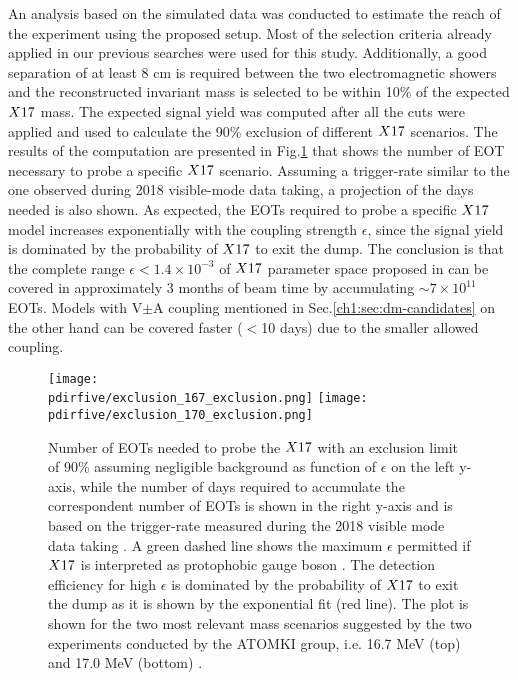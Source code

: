 An analysis based on the simulated data was conducted to estimate the reach of the experiment using the proposed setup. Most of the selection criteria already applied in our previous searches were used for this study. Additionally, a good separation of at least 8 cm is required between the two electromagnetic showers and the reconstructed invariant mass is selected to be within 10\% of the expected $X17$ mass. The expected signal yield was computed after all the cuts were applied and used to calculate the 90\% exclusion of different $X17$ scenarios. The results of the computation are presented in Fig.\ref{fig:exclusion-x17} that shows the number of EOT necessary to probe a specific $X17$ scenario. Assuming a trigger-rate similar to the one observed during 2018 visible-mode data taking, a projection of the days needed is also shown. As expected, the EOTs required to probe a specific $X17$ model increases exponentially with the coupling strength $\epsilon$, since the signal yield is dominated by the probability of $X17$ to exit the dump. The conclusion is that the complete range $\epsilon < 1.4 \times 10^{-3}$ of $X17$ parameter space proposed in \cite{PhysRevD.95.035017} can be covered in approximately 3 months of beam time by accumulating $\sim 7 \times 10^{11}$ EOTs. Models with V$\pm$A coupling mentioned in Sec.\ref{ch1:sec:dm-candidates} on the other hand can be covered faster ($<$10 days) due to the smaller allowed coupling. 

\begin{figure}[htb!]
  \centering
  \texttt{[image: \\pdirfive/exclusion\_167\_exclusion.png]}
  \texttt{[image: \\pdirfive/exclusion\_170\_exclusion.png]}
  \caption[EOT to X17 exclusion]{Number of EOTs needed to probe the $X17$ with an exclusion limit of 90\% assuming negligible background as function of $\epsilon$ on the left y-axis, while the number of days required to accumulate the correspondent number of EOTs is shown in the right y-axis and is based on the trigger-rate measured during the 2018 visible mode data taking \cite{Banerjee:2019hmi}. A green dashed line shows the maximum $\epsilon$ permitted if $X17$ is interpreted as protophobic gauge boson \cite{PhysRevD.95.035017}. The detection efficiency for high $\epsilon$ is dominated by the probability of $X17$ to exit the dump as it is shown by the exponential fit (red line). The plot is shown for the two most relevant mass scenarios suggested by the two experiments conducted by the ATOMKI group, i.e. 16.7 MeV (top) and 17.0 MeV (bottom) \cite{Krasznahorkay:2015iga,Krasznahorkay:2019lyl}.}
  \label{fig:exclusion-x17}
\end{figure}
  
